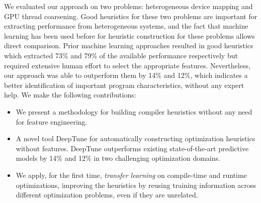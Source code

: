 We evaluated our approach on two problems: heterogeneous device mapping and GPU thread coarsening. Good heuristics for these two problems are important for extracting performance from heterogeneous systems, and the fact that machine learning has been used before for heuristic construction for these problems allows direct comparison. Prior machine learning approaches resulted in good heuristics which extracted 73\% and 79\% of the available performance respectively but required extensive human effort to select the appropriate features. Nevertheless, our approach was able to outperform them by 14\% and 12\%, which indicates a better identification of important program characteristics, without any expert help. We make the following contributions:
%
\begin{itemize}
  \item We present a methodology for building compiler heuristics without any need for feature engineering.
  \item A novel tool DeepTune for automatically constructing optimization heuristics without features. DeepTune outperforms existing state-of-the-art predictive models by 14\% and 12\% in two challenging optimization domains.
  \item We apply, for the first time, \emph{transfer learning} on compile-time and runtime optimizations, improving the heuristics by reusing training information across different optimization problems, even if they are unrelated.
\end{itemize}
